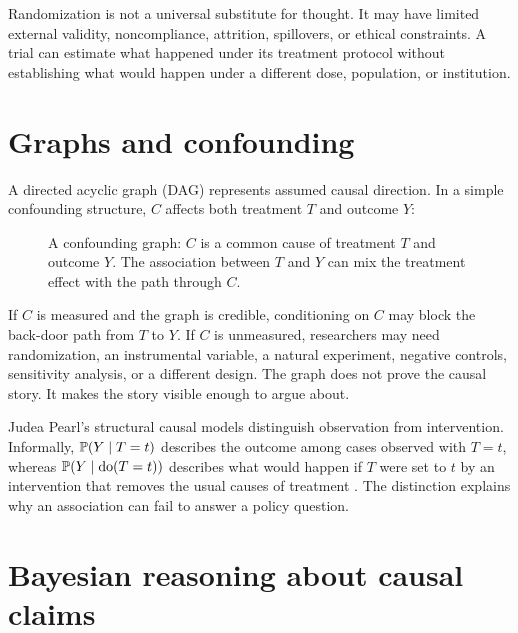 Randomization is not a universal substitute for thought. It may have limited
external validity, noncompliance, attrition, spillovers, or ethical
constraints. A trial can estimate what happened under its treatment protocol
without establishing what would happen under a different dose, population, or
institution.

\section{Graphs and confounding}

A directed acyclic graph (DAG) represents assumed causal direction. In a
simple confounding structure, \(C\) affects both treatment \(T\) and outcome
\(Y\):

\begin{figure}[ht]
\centering
{}
\caption{A confounding graph: \(C\) is a common cause of treatment \(T\) and
outcome \(Y\). The association between \(T\) and \(Y\) can mix the treatment
effect with the path through \(C\).}
\label{fig:confounding}
\end{figure}

If \(C\) is measured and the graph is credible, conditioning on \(C\) may
block the back-door path from \(T\) to \(Y\). If \(C\) is unmeasured, researchers
may need randomization, an instrumental variable, a natural experiment,
negative controls, sensitivity analysis, or a different design. The graph
does not prove the causal story. It makes the story visible enough to argue
about.

Judea Pearl's structural causal models distinguish observation from
intervention. Informally, \(\mathbb{P}(Y\mid T=t)\) describes the outcome among
cases observed with \(T=t\), whereas \(\mathbb{P}(Y\mid \operatorname{do}(T=t))\) describes what
would happen if \(T\) were set to \(t\) by an intervention that removes the
usual causes of treatment \citep{pearl2009}. The distinction explains why an
association can fail to answer a policy question.

\section{Bayesian reasoning about causal claims}

